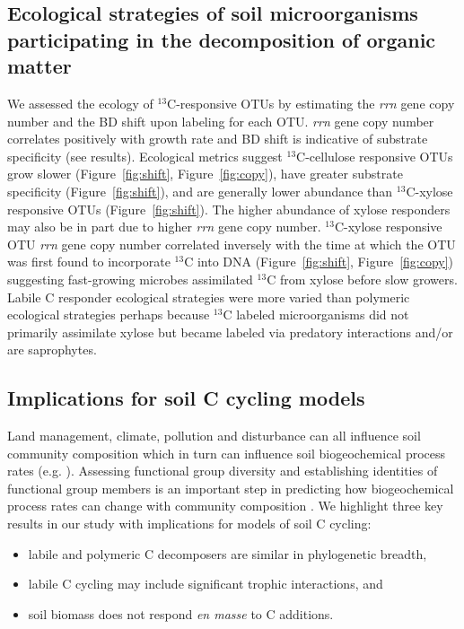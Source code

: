 \subsection{Ecological strategies of soil microorganisms participating in the
decomposition of organic matter}
We assessed the ecology of $^{13}$C-responsive OTUs by estimating the
\textit{rrn} gene copy number and the BD shift upon labeling for each OTU.
\textit{rrn} gene copy number correlates positively with growth rate
\citep{11125085} and BD shift is indicative of substrate specificity (see
results). Ecological metrics suggest $^{13}$C-cellulose responsive OTUs grow
slower (Figure~\ref{fig:shift}, Figure~\ref{fig:copy}), have greater substrate
specificity (Figure~\ref{fig:shift}), and are generally lower abundance than
$^{13}$C-xylose responsive OTUs (Figure~\ref{fig:shift}). The higher abundance
of xylose responders may also be in part due to higher \textit{rrn} gene copy
number. $^{13}$C-xylose responsive OTU \textit{rrn} gene copy number correlated
inversely with the time at which the OTU was first found to incorporate
$^{13}$C into DNA (Figure~\ref{fig:shift}, Figure~\ref{fig:copy}) suggesting
fast-growing microbes assimilated $^{13}$C from xylose before slow growers.
Labile C responder ecological strategies were more varied than polymeric
ecological strategies perhaps because $^{13}$C labeled microorganisms did not
primarily assimilate xylose but became labeled via predatory interactions
and/or are saprophytes. 

\subsection{Implications for soil C cycling models}
Land management, climate, pollution and disturbance can all influence soil
community composition \citep{McGuire2010}which in turn can influence soil
biogeochemical process rates (e.g. \citep{Berlemont2014a}). Assessing
functional group diversity and establishing identities of functional group
members is an important step in predicting how biogeochemical process rates can
change with community composition \citep{Schimel_1995,McGuire2010}. We
highlight three key results in our study with implications for models of soil
C cycling: \begin{itemize} \item labile and polymeric C decomposers are similar
in phylogenetic breadth, \item labile C cycling may include significant trophic
interactions, and \item soil biomass does not respond \textit{en masse} to
C additions.\end{itemize}

